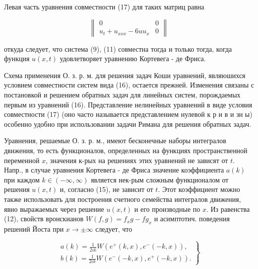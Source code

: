 \documentclass[10pt]{article}
\begin{document}
Левая часть уравнения совместности (17) для таких матриц равна



\[

\left\|\begin{array}{ll}

0 & 0 \\

u_{t}+u_{x x x}-6 u u_{x} & 0

\end{array}\right\|

\]



откуда следует, что система (9), (11) совместна тогда и только тогда, когда функция $u(x, t)$ удовлетворяет уравнению Кортевега - де Фриса.



Схема применения О. з. р. м. для решения задач Коши уравнений, являюшихся условием совместности систем вида (16), остается прежней. Изменения связаны с постановкой и решением обратных задач для линейных систем, порождаемых первым из уравнений (16). Представление нелинейных уравнений в виде условия совместности (17) (оно часто называется представлением нулевой к р и в и зн ы) особенно удобно при использовании задачи Римана для решения обратных задач.



Уравнения, решаемые О. з. р. м., имеют бесконечные наборы интегралов движения, то есть функционалов, определенных на функциях пространственной переменной $x$, значения к-рых на решениях этих уравнений не зависят от $t$. Напр., в случае уравнения Кортевега - де Фриса значение коэффициента $a(k)$ при каждом $k \in(-\infty, \infty)$ является нек-рым сложным функционалом от решения $u(x, t)$ и, согласно (15), не зависит от $t$. Этот коэффициент можно также использовать для построения счетного семейства интегралов движения, явно выражаемых через решение $u(x, t)$ и его производные по $x$. Из равенства (12), свойств вронскианов $W(f, g)=f_{x} g-f g_{x}$ и асимптотич. поведения решений Йоста при $x \rightarrow \pm \infty$ следует, что



\[

\left.\begin{array}{l}

a(k)=\frac{1}{2 i k} W\left(e^{+}(k, x), e^{-}(-k, x)\right), \\

b(k)=\frac{1}{2 i k} W\left(e^{-}(-k, x), e^{+}(-k, x)\right) .

\end{array}\right\}

\]
\end{document}

